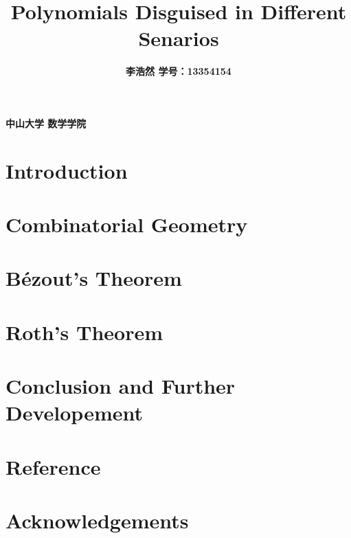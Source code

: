 \documentclass[a4paper]{article}
\begin{document}
 \sloppy %

\title{\textbf{Polynomials Disguised in Different Senarios}}
\author{\textbf{李浩然 \quad 学号：13354154}}
\date{}
\maketitle

\begin{center}
\textbf{中山大学 \quad 数学学院}
\end{center}



\newpage

\tableofcontents

\newpage

\section{Introduction}



\section{Combinatorial Geometry}



\section{B\'ezout's Theorem}



\section{Roth's Theorem}



\section{Conclusion and Further Developement}



\section{Reference}



\section{Acknowledgements}


\end{document}
